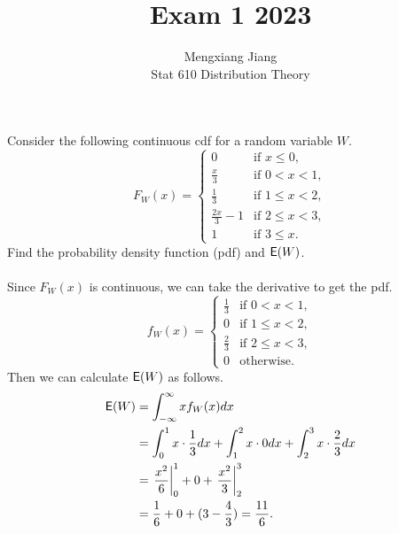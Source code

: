 \documentclass[12pt]{article}
\newcommand{\E}{{\sf E}}
\newenvironment{problem}[2][Problem]{\begin{trivlist}
\item[\hskip \labelsep {\bfseries #1}\hskip \labelsep {\bfseries #2.}]}
{\end{trivlist}}
\begin{document}
 
 
\title{Exam 1 2023}%
\author{Mengxiang Jiang\\ %
Stat 610 Distribution Theory} %
 
\maketitle
 
\begin{problem}{1} %
  Consider the following continuous cdf for a random variable $W$.
  \[
    F_W (x) =
    \begin{cases}
      0 & \text{if } x \le 0, \\
      \frac{x}{3} & \text{if } 0 < x < 1, \\
      \frac{1}{3} & \text{if } 1 \le x < 2, \\
      \frac{2x}{3} - 1 & \text{if } 2 \le x < 3, \\
      1 & \text{if } 3 \le x.
    \end{cases}
  \]
  Find the probability density function (pdf) and $\E(W)$.
  \\\\
  Since $F_W (x)$ is continuous, we can take the derivative to get the pdf.
  \[
    f_W (x) =
    \begin{cases}
      \frac{1}{3} & \text{if } 0 < x < 1, \\
      0 & \text{if } 1 \le x < 2, \\
      \frac{2}{3} & \text{if } 2 \le x < 3, \\
      0 & \text{otherwise}.
    \end{cases}
  \]
  Then we can calculate $\E(W)$ as follows.
  \[
    \begin{aligned}
      \E(W) &= \int_{-\infty}^{\infty} x f_W (x) dx \\
      &= \int_0^1 x \cdot \frac{1}{3} dx 
      + \int_1^2 x \cdot 0 dx + \int_2^3 x \cdot \frac{2}{3} dx \\
      &= \left. \frac{x^2}{6} \right|_0^1 + 0 
      + \left. \frac{x^2}{3} \right|_2^3 \\
      &= \frac{1}{6} + 0 + (3 - \frac{4}{3}) = \frac{11}{6}.
    \end{aligned}
  \]
\end{problem}
\end{document}
